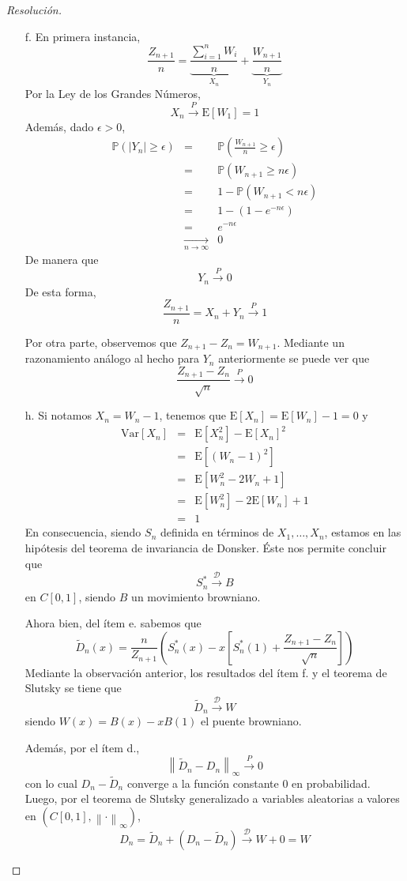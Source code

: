 \documentclass[a4paper,11pt]{article}
\newcommand{\abs}[1]{\ensuremath{\left\lvert #1 \right\rvert}}
\newcommand{\Exp}[1]{\ensuremath{\textrm{E}\left[#1\right]}}
\newcommand{\Prob}[1]{\ensuremath{\mathbb{P} \left( #1 \right)}}
\newcommand{\norm}[1]{\left\lVert#1\right\rVert}
\newcommand{\normi}[1]{\norm{#1}_{\infty}}
\newcommand{\Sst}[1]{S_n^{*}(#1)}
\begin{document}
\begin{proof}[Resoluci\'on]
\begin{enumerate}
    \item[f.] En primera instancia,
    $$\frac{Z_{n+1}}{n} = \underbrace{\frac{\sum_{i=1}^{n}{W_i}}{n}}_{X_n} + \underbrace{\frac{W_{n+1}}{n}}_{Y_n}$$
    Por la Ley de los Grandes Números,
    $$X_n \overset{P}{\longrightarrow} \Exp{W_1} = 1$$
    Además, dado $\epsilon > 0$,
    \begin{eqnarray*}
        \Prob{\abs{Y_n} \geq \epsilon} &=& \Prob{\frac{W_{n+1}}{n} \geq \epsilon} \\
            &=& \Prob{W_{n+1} \geq n \epsilon} \\
            &=& 1 - \Prob{W_{n+1} < n \epsilon} \\
            &=& 1 - \left(1 - e^{-n \epsilon}\right) \\
            &=& e^{-n \epsilon} \\
            &\underset{n \to \infty}{\longrightarrow}& 0
    \end{eqnarray*}
    De manera que
    $$Y_n \overset{P}{\longrightarrow} 0$$
    De esta forma,
    $$\frac{Z_{n+1}}{n} = X_n + Y_n \overset{P}{\longrightarrow} 1$$

    Por otra parte, observemos que $Z_{n+1} - Z_n = W_{n+1}$. Mediante un razonamiento análogo
    al hecho para $Y_n$ anteriormente se puede ver que 
    $$\frac{Z_{n+1} - Z_n}{\sqrt{n}} \overset{P}{\longrightarrow} 0$$

    \item[h.] 
    Si notamos $X_n = W_n - 1$, tenemos que $\Exp{X_n} = \Exp{W_n} - 1 = 0$ y
    \begin{eqnarray*}
       \text{Var}[X_n] &=& \Exp{X_n^2} - \Exp{X_n}^2 \\
            &=& \Exp{(W_n - 1)^2} \\
            &=& \Exp{W_n^2 - 2W_n + 1} \\
            &=& \Exp{W_n^2} - 2\Exp{W_n} + 1 \\
            &=& 1
    \end{eqnarray*}
    En consecuencia, siendo $S_n$ definida en términos de $X_1,\dots,X_n$, estamos en las hipótesis del teorema 
    de invariancia de Donsker. Éste nos permite concluir que
    $$S_n^{*} \overset{\mathcal{D}}{\longrightarrow} B$$
    en $C[0,1]$, siendo $B$ un movimiento browniano.

    Ahora bien, del ítem e. sabemos que 
    $$\tilde{D}_n(x) = \frac{n}{Z_{n+1}} \left(\Sst{x} - x \left[ \Sst{1} + \frac{Z_{n+1} - Z_n}{\sqrt{n}} \right] \right)$$
    Mediante la observación anterior, los resultados del ítem f. y el teorema de Slutsky se tiene que
    $$\tilde{D}_n \overset{\mathcal{D}}{\longrightarrow} W$$
    siendo $W(x) = B(x) - xB(1)$ el puente browniano.

    Además, por el ítem d.,
    $$\normi{\tilde{D}_n - D_n} \overset{P}{\longrightarrow} 0$$
    con lo cual $D_n - \tilde{D}_n$ converge a la función constante 0 en probabilidad. Luego, por el teorema
    de Slutsky generalizado a variables aleatorias a valores en $(C[0,1], \normi{\cdot})$,
    $$D_n = \tilde{D}_n + (D_n - \tilde{D}_n) \overset{\mathcal{D}}{\longrightarrow} W + 0 = W$$
\end{enumerate}
\end{proof}
\end{document}
